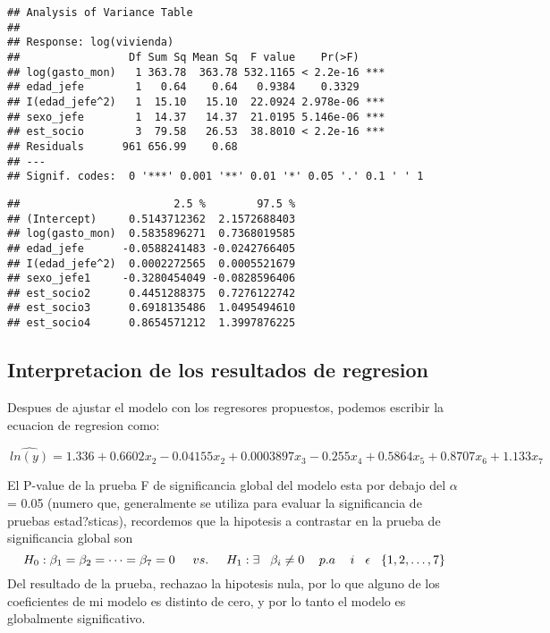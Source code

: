 \documentclass[]{book}
\begin{document}
\begin{verbatim}
## Analysis of Variance Table
## 
## Response: log(vivienda)
##                 Df Sum Sq Mean Sq  F value    Pr(>F)    
## log(gasto_mon)   1 363.78  363.78 532.1165 < 2.2e-16 ***
## edad_jefe        1   0.64    0.64   0.9384    0.3329    
## I(edad_jefe^2)   1  15.10   15.10  22.0924 2.978e-06 ***
## sexo_jefe        1  14.37   14.37  21.0195 5.146e-06 ***
## est_socio        3  79.58   26.53  38.8010 < 2.2e-16 ***
## Residuals      961 656.99    0.68                       
## ---
## Signif. codes:  0 '***' 0.001 '**' 0.01 '*' 0.05 '.' 0.1 ' ' 1
\end{verbatim}

\begin{verbatim}
##                        2.5 %        97.5 %
## (Intercept)     0.5143712362  2.1572688403
## log(gasto_mon)  0.5835896271  0.7368019585
## edad_jefe      -0.0588241483 -0.0242766405
## I(edad_jefe^2)  0.0002272565  0.0005521679
## sexo_jefe1     -0.3280454049 -0.0828596406
## est_socio2      0.4451288375  0.7276122742
## est_socio3      0.6918135486  1.0495494610
## est_socio4      0.8654571212  1.3997876225
\end{verbatim}

\subsection{Interpretacion de los resultados de
regresion}\label{interpretacion-de-los-resultados-de-regresion}

Despues de ajustar el modelo con los regresores propuestos, podemos
escribir la ecuacion de regresion como:

\[\ \hat{ln(y)} = 1.336 + 0.6602x_{2} - 0.04155x_{2} + 0.0003897x_{3} -0.255x_{4} + 0.5864x_{5} + 0.8707x_{6} + 1.133x_{7}\]

El P-value de la prueba F de significancia global del modelo esta por
debajo del \(\alpha\) = 0.05 (numero que, generalmente se utiliza para
evaluar la significancia de pruebas estad?sticas), recordemos que la
hipotesis a contrastar en la prueba de significancia global son
\[ \ H_{0} : \beta_{1} = \beta_{2} = \cdots = \beta_{7} = 0 \hspace{0.5cm}vs.\hspace{0.5cm} H_{1} : \exists \hspace{0.3cm}   \beta_{i} \neq 0 \hspace{0.3cm} \ p.a  \hspace{0.3cm} \ i \hspace{0.3cm} \epsilon  \hspace{0.3cm} \{1,2,\dots,7\} \]
Del resultado de la prueba, rechazao la hipotesis nula, por lo que
alguno de los coeficientes de mi modelo es distinto de cero, y por lo
tanto el modelo es globalmente significativo.
\end{document}

